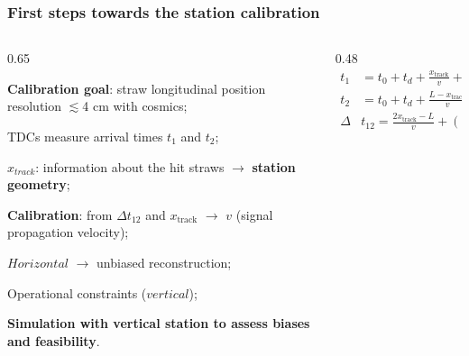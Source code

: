 \documentclass{beamer}
\begin{document}
\begin{frame}
    \frametitle{First steps towards the station calibration}
    
      \begin{columns}
        \begin{column}{0.65\framewidth}
                \setlength{\leftmargini}{1.2em}
                \vspace{-7mm}
            \begin{itemize}
             {\footnotesize 
             \item \textbf{Calibration goal}: straw longitudinal position resolution $\lesssim$4 cm with cosmics;
           \vspace{4mm}
             \item TDCs measure arrival times $t_1$ and $t_2$;
             \vspace{4mm}
             \item $x_{track}$: information about the hit straws $\rightarrow$ \textbf{station geometry};   
  \vspace{4mm}
                \item \textbf{Calibration}: from $\Delta t_{12}$ and $x_{\text{track}}$ $\rightarrow$ $v$ (signal propagation velocity);                  
              \vspace{4mm}
                \item $Horizontal$ $\rightarrow$ unbiased reconstruction; 
                               \vspace{4mm}
                \item Operational constraints ($vertical$);
                  \vspace{4mm}
                \item \textbf{Simulation with vertical station to assess biases and feasibility}.}  
            \end{itemize}
        \end{column}
        \begin{column}{0.48\framewidth}
            \begin{equation*}
\begin{aligned}
    t_1 &= t_0 + t_d + \frac{x_{\text{track}}}{v}  + d_1 \\
    t_2 &= t_0 + t_d + \frac{L - x_{\text{track}}}{v}  + d_2 \\
    \Delta & t_{12} = \frac{2x_{\text{track}}-L}{v} +(d_1-d_2)
\end{aligned}
\end{equation*}


\end{column}
\end{columns}
\end{frame}
\end{document}
